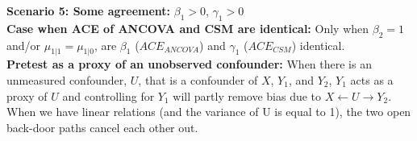 \documentclass[a4paper,7pt,landscape]{extarticle}
\begin{document}
\begin{multicols}{3}
\begin{boxA}
\textbf{Scenario 5: Some agreement:} $\beta_1 > 0$, $\gamma_1 > 0$\\
\textbf{Case when ACE of ANCOVA and CSM are identical:} Only when $\beta_2 = 1$ and/or $\mu_{1|1} = \mu_{1|0}$, are $\beta_1$ ($ACE_{ANCOVA}$) and $\gamma_1$ ($ACE_{CSM}$) identical.\\
\textbf{Pretest as a proxy of an unobserved confounder:} When there is an unmeasured confounder, $U$, that is a confounder of $X$, $Y_1$, and $Y_2$, $Y_1$ acts as a proxy of $U$ and controlling for $Y_1$ will partly remove bias due to $X \leftarrow U \rightarrow Y_2$. When we have linear relations (and the variance of U is equal to 1),  the two open back-door paths cancel each other out.\\    

\end{boxA}


\end{multicols}
\end{document}
